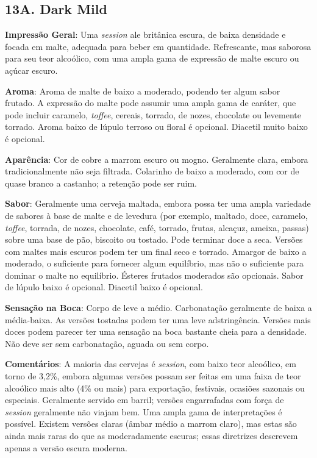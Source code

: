 \subsection*{13A. Dark Mild}
\textbf{Impressão Geral}: Uma \textit{session} ale britânica escura, de baixa densidade e focada em malte, adequada para beber em quantidade. Refrescante, mas saborosa para seu teor alcoólico, com uma ampla gama de expressão de malte escuro ou açúcar escuro.

\textbf{Aroma}: Aroma de malte de baixo a moderado, podendo ter algum sabor frutado. A expressão do malte pode assumir uma ampla gama de caráter, que pode incluir caramelo, \textit{toffee}, cereais, torrado, de nozes, chocolate ou levemente torrado. Aroma baixo de lúpulo terroso ou floral é opcional. Diacetil muito baixo é opcional.

\textbf{Aparência}: Cor de cobre a marrom escuro ou mogno. Geralmente clara, embora tradicionalmente não seja filtrada. Colarinho de baixo a moderado, com cor de quase branco a castanho; a retenção pode ser ruim.

\textbf{Sabor}: Geralmente uma cerveja maltada, embora possa ter uma ampla variedade de sabores à base de malte e de levedura (por exemplo, maltado, doce, caramelo, \textit{toffee}, torrada, de nozes, chocolate, café, torrado, frutas, alcaçuz, ameixa, passas) sobre uma base de pão, biscoito ou tostado. Pode terminar doce a seca. Versões com maltes mais escuros podem ter um final seco e torrado. Amargor de baixo a moderado, o suficiente para fornecer algum equilíbrio, mas não o suficiente para dominar o malte no equilíbrio. Ésteres frutados moderados são opcionais. Sabor de lúpulo baixo é opcional. Diacetil baixo é opcional.

\textbf{Sensação na Boca}: Corpo de leve a médio. Carbonatação geralmente de baixa a média-baixa. As versões tostadas podem ter uma leve adstringência. Versões mais doces podem parecer ter uma sensação na boca bastante cheia para a densidade. Não deve ser sem carbonatação, aguada ou sem corpo.

\textbf{Comentários}: A maioria das cervejas é \textit{session}, com baixo teor alcoólico, em torno de 3,2\%, embora algumas versões possam ser feitas em uma faixa de teor alcoólico mais alto (4\% ou mais) para exportação, festivais, ocasiões sazonais ou especiais. Geralmente servido em barril; versões engarrafadas com força de \textit{session} geralmente não viajam bem. Uma ampla gama de interpretações é possível. Existem versões claras (âmbar médio a marrom claro), mas estas são ainda mais raras do que as moderadamente escuras; essas diretrizes descrevem apenas a versão escura moderna.

